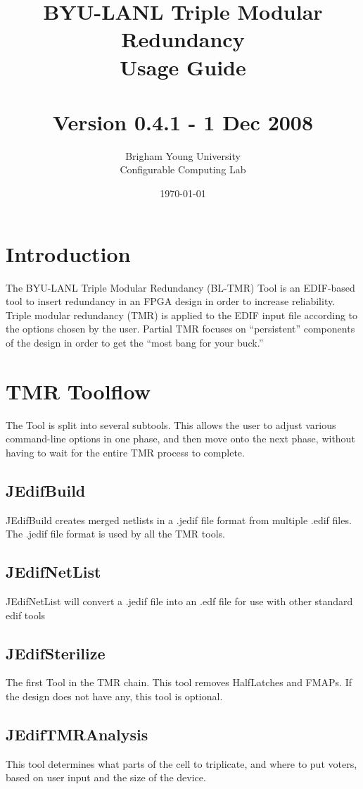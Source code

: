 \documentclass[english]{article}
\title{BYU-LANL Triple Modular Redundancy \\ Usage Guide \\ ~ \\
  Version 0.4.1 - 1 Dec 2008 \\  }
\author{Brigham Young University \\ Configurable Computing Lab}
\date{\today}
\begin{document}
\maketitle

\newpage
\tableofcontents
\newpage

\section{Introduction}
The BYU-LANL Triple Modular Redundancy (BL-TMR) Tool is an EDIF-based tool to 
insert redundancy in an FPGA design in order to increase reliability. Triple 
modular redundancy (TMR) is applied to the EDIF input file according to the 
options chosen by the user. Partial TMR focuses on ``persistent'' components of 
the design in order to get the ``most bang for your buck.''

\section{TMR Toolflow}
The Tool is split into several subtools. This allows the user to adjust various 
command-line options in one phase, and then move onto the next phase, without
having to wait for the entire TMR process to complete.

\subsection{JEdifBuild}
JEdifBuild creates merged netlists in a .jedif file format from 
multiple .edif files. The .jedif file format is used by all the TMR tools.

\subsection{JEdifNetList}
JEdifNetList will convert a .jedif file into an .edf file for use with other
standard edif tools 

\subsection{JEdifSterilize}
The first Tool in the TMR chain. This tool removes HalfLatches and FMAPs. If the 
design does not have any, this tool is optional.

\subsection{JEdifTMRAnalysis}
This tool determines what parts of the cell to triplicate, and where to put voters,
based on user input and the size of the device.
\end{document}
